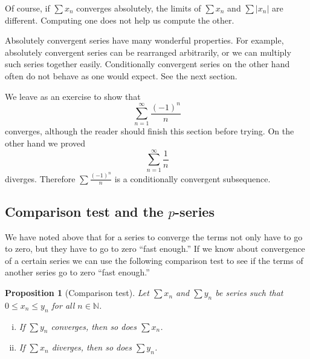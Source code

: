 \documentclass[12pt]{book}
\newcommand{\abs}[1]{\left\lvert {#1} \right\rvert}
\newcommand{\N}{{\mathbb{N}}}
\theoremstyle{plain}
\newtheorem{prop}[thm]{Proposition}
\theoremstyle{remark}
\theoremstyle{definition}
\theoremstyle{exercise}
\theoremstyle{example}
\begin{document}
Of course, if $\sum x_n$ converges absolutely, the limits of
$\sum x_n$ and $\sum \abs{x_n}$ are different.  Computing one
does not help us compute the other.

Absolutely convergent series have many wonderful properties.
For example, absolutely convergent
series can be rearranged arbitrarily, or we can multiply such
series together easily.  Conditionally convergent series on the other hand
often do not behave as one would expect.  See the next section.

We leave as an exercise to show that
\begin{equation*}
\sum_{n=1}^\infty \frac{{(-1)}^n}{n}
\end{equation*}
converges, although the reader should finish this section before trying.
On the other hand we proved
\begin{equation*}
\sum_{n=1}^\infty \frac{1}{n}
\end{equation*}
diverges.  Therefore 
$\sum \frac{{(-1)}^n}{n}$ is a conditionally convergent subsequence.

\subsection{Comparison test and the \texorpdfstring{$p$}{p}-series}

We have noted above that for a series to converge
the terms not only have to go to zero, but they have to go to zero ``fast
enough.''  If we know about convergence of a certain series
we can use the following comparison test to see if the terms of another
series go to zero ``fast enough.''

\begin{samepage}
\begin{prop}[Comparison test]
Let $\sum x_n$ and $\sum y_n$ be series such that $0 \leq x_n \leq y_n$
for all $n \in \N$.
\begin{enumerate}[(i)]
\item If $\sum y_n$ converges, then so does $\sum x_n$.
\item If $\sum x_n$ diverges, then so does $\sum y_n$.
\end{enumerate}
\end{prop}
\end{samepage}
\end{document}
